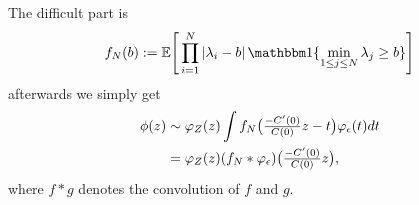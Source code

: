 The difficult part is
\[
	f_\dimension(b):=\E\Bigg[
		\prod_{i=1}^\dimension \left|
			\lambda_i - b
		\right|
		\ind\{\min_{1\le j\le\dimension}\lambda_j\ge b\}
	\Bigg]
\]
afterwards we simply get
\[\begin{aligned}
	\phi(z)
	&\sim \varphi_Z(z)
	\int f_N\bigl(\tfrac{-C'(0)}{C(0)}z - t\bigr)
	\varphi_\epsilon(t)dt\\
	&= \varphi_Z(z)
	(f_N * \varphi_\epsilon)\bigl(\tfrac{-C'(0)}{C(0)}z\bigr),
\end{aligned}\]
where \(f*g\) denotes the convolution of \(f\) and \(g\).

